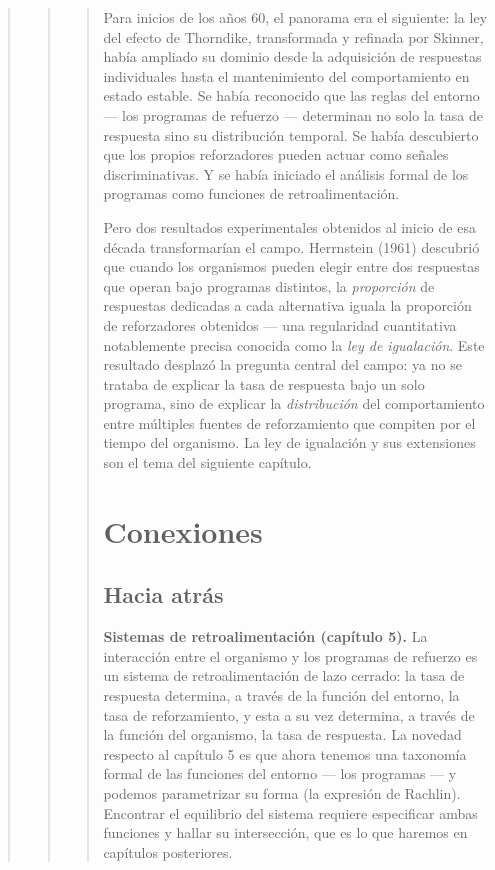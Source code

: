\documentclass[
  letterpaper,
  DIV=11,
  numbers=noendperiod]{scrreprt}
\begin{document}
\begin{tcolorbox}[enhanced jigsaw, arc=.35mm, bottomrule=.15mm, breakable, colback=white, colframe=quarto-callout-note-color-frame, left=2mm, leftrule=.75mm, opacityback=0, rightrule=.15mm, toprule=.15mm]
\begin{quote}
\begin{quote}
\begin{quote}
Para inicios de los años 60, el panorama era el siguiente: la ley del
efecto de Thorndike, transformada y refinada por Skinner, había ampliado
su dominio desde la adquisición de respuestas individuales hasta el
mantenimiento del comportamiento en estado estable. Se había reconocido
que las reglas del entorno --- los programas de refuerzo --- determinan
no solo la tasa de respuesta sino su distribución temporal. Se había
descubierto que los propios reforzadores pueden actuar como señales
discriminativas. Y se había iniciado el análisis formal de los programas
como funciones de retroalimentación.

Pero dos resultados experimentales obtenidos al inicio de esa década
transformarían el campo. Herrnstein (1961) descubrió que cuando los
organismos pueden elegir entre dos respuestas que operan bajo programas
distintos, la \emph{proporción} de respuestas dedicadas a cada
alternativa iguala la proporción de reforzadores obtenidos --- una
regularidad cuantitativa notablemente precisa conocida como la \emph{ley
de igualación}. Este resultado desplazó la pregunta central del campo:
ya no se trataba de explicar la tasa de respuesta bajo un solo programa,
sino de explicar la \emph{distribución} del comportamiento entre
múltiples fuentes de reforzamiento que compiten por el tiempo del
organismo. La ley de igualación y sus extensiones son el tema del
siguiente capítulo.

\mbox{}%
\section{Conexiones}\label{conexiones-6}

\mbox{}%
\subsection{Hacia atrás}\label{hacia-atruxe1s-1}

\textbf{Sistemas de retroalimentación (capítulo 5).} La interacción
entre el organismo y los programas de refuerzo es un sistema de
retroalimentación de lazo cerrado: la tasa de respuesta determina, a
través de la función del entorno, la tasa de reforzamiento, y esta a su
vez determina, a través de la función del organismo, la tasa de
respuesta. La novedad respecto al capítulo 5 es que ahora tenemos una
taxonomía formal de las funciones del entorno --- los programas --- y
podemos parametrizar su forma (la expresión de Rachlin). Encontrar el
equilibrio del sistema requiere especificar ambas funciones y hallar su
intersección, que es lo que haremos en capítulos posteriores.


\end{quote}
\end{quote}
\end{quote}
\end{tcolorbox}
\end{document}
